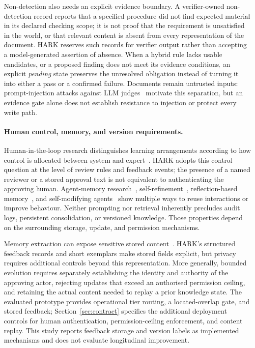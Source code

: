\documentclass[computers,article,submit,moreauthors]{Definitions/mdpi}
\begin{document}
Non-detection also needs an explicit evidence boundary. A verifier-owned non-detection record reports that a specified procedure did not find expected material in its declared checking scope; it is not proof that the requirement is unsatisfied in the world, or that relevant content is absent from every representation of the document. HARK reserves such records for verifier output rather than accepting a model-generated assertion of absence. When a hybrid rule lacks usable candidates, or a proposed finding does not meet its evidence conditions, an explicit \emph{pending} state preserves the unresolved obligation instead of turning it into either a pass or a confirmed failure. Documents remain untrusted inputs: prompt-injection attacks against LLM judges~\cite{shi2024inject} motivate this separation, but an evidence gate alone does not establish resistance to injection or protect every write path.

\paragraph{Human control, memory, and version requirements.}
Human-in-the-loop research distinguishes learning arrangements according to how control is allocated between system and expert~\cite{mosqueira2023}. HARK adopts this control question at the level of review rules and feedback events; the presence of a named reviewer or a stored approval text is not equivalent to authenticating the approving human. Agent-memory research~\cite{wang2024agents}, self-refinement~\cite{madaan2023}, reflection-based memory~\cite{shinn2023}, and self-modifying agents~\cite{zhang2025dgm} show multiple ways to reuse interactions or improve behaviour. Neither prompting nor retrieval inherently precludes audit logs, persistent consolidation, or versioned knowledge. Those properties depend on the surrounding storage, update, and permission mechanisms.

Memory extraction can expose sensitive stored content~\cite{mempriv2025}. HARK's structured feedback records and short exemplars make stored fields explicit, but privacy requires additional controls beyond this representation. More generally, bounded evolution requires separately establishing the identity and authority of the approving actor, rejecting updates that exceed an authorised permission ceiling, and retaining the actual content needed to replay a prior knowledge state. The evaluated prototype provides operational tier routing, a located-overlap gate, and stored feedback; Section~\ref{sec:contract} specifies the additional deployment controls for human authentication, permission-ceiling enforcement, and content replay. This study reports feedback storage and version labels as implemented mechanisms and does not evaluate longitudinal improvement.
\end{document}
